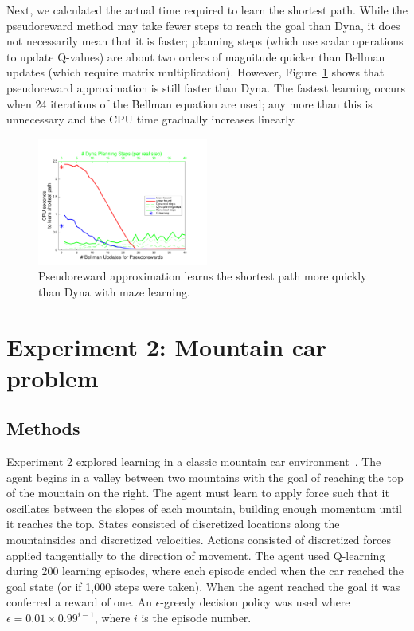 \documentclass[letterpaper]{article}
\begin{document}
Next, we calculated the actual time required to learn the shortest path. While the pseudoreward method may take fewer steps to reach the goal than Dyna, it does not necessarily mean that it is faster; planning steps (which use scalar operations to update Q-values) are about two orders of magnitude quicker than Bellman updates (which require matrix multiplication). However, Figure~\ref{fig:maze2} shows that pseudoreward approximation is still faster than Dyna. The fastest learning occurs when 24 iterations of the Bellman equation are used; any more than this is unnecessary and the CPU time gradually increases linearly.

\begin{figure}[t]
\centering
\includegraphics[width=0.5\textwidth]{cpus_vs_PRiterations_DYNA_toGoal}
\caption{Pseudoreward approximation learns the shortest path more quickly than Dyna with maze learning.}
\label{fig:maze2}
\end{figure}

\section{Experiment 2: Mountain car problem}

\subsection{Methods}

Experiment 2 explored learning in a classic mountain car environment~\cite{moore1990efficient, sutton1996generalization, sutton1998reinforcement, smart2000practical, rasmussen2003gaussian, whiteson2006evolutionary, heidrich2008variable, sutton2012dyna}. The agent begins in a valley between two mountains with the goal of reaching the top of the mountain on the right. The agent must learn to apply force such that it oscillates between the slopes of each mountain, building enough momentum until it reaches the top. States consisted of discretized locations along the mountainsides and discretized velocities. Actions consisted of discretized forces applied tangentially to the direction of movement. The agent used Q-learning during 200 learning episodes, where each episode ended when the car reached the goal state (or if 1,000 steps were taken). When the agent reached the goal it was conferred a reward of one. An $\epsilon$-greedy decision policy was used where $\epsilon=0.01\times0.99^{i-1}$, where $i$ is the episode number.
\end{document}
